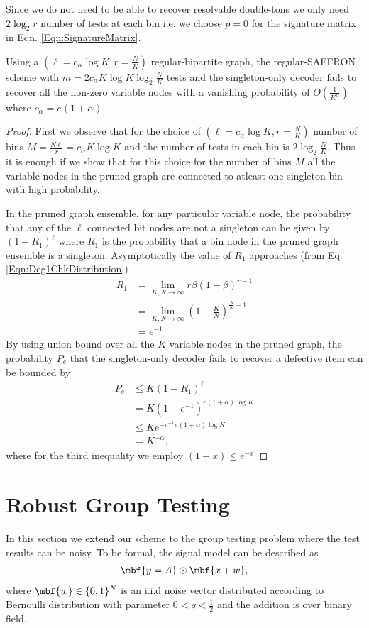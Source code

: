 \documentclass[conference,,twocolumn]{IEEEtran}
\begin{document}
Since we do not need to be able to recover resolvable double-tons we only need $2\log_2 r$ number of tests at each bin i.e. we choose $p=0$ for the signature matrix in Eqn. \eqref{Eqn:SignatureMatrix}.
\begin{theorem}
Using a $(\ell=c_\alpha \log K,r=\frac{N}{K})$ regular-bipartite graph, the regular-SAFFRON scheme with $m=2c_\alpha K\log K \log_2 \frac{N}{K}$ tests and the singleton-only decoder fails to recover all the non-zero variable nodes with a vanishing probability of $O(\frac{1}{K^{\alpha}})$ where $c_\alpha=e(1+\alpha)$.
\end{theorem}
\begin{proof}
First we observe that for the choice of $(\ell=c_\alpha \log K,r=\frac{N}{K})$ number of bins $M=\frac{N\ell}{r}=c_\alpha K \log K$ and the number of tests in each bin is $2\log_2 \frac{N}{K}$. Thus it is enough if we show that for this choice for the number of bins $M$ all the variable nodes in the pruned graph are connected to atleast one singleton bin with high probability.

In the pruned graph ensemble, for any particular variable node, the probability that any of the $\ell$ connected bit nodes are not a singleton can be given by $(1-R_1)^\ell$ where $R_1$ is the probability that a bin node in the pruned graph ensemble is a singleton. Asymptotically the value of $R_1$ approaches (from Eq. \ref{Eqn:Deg1ChkDistribution})
\begin{align*}
R_1&=\lim _{K,N\rightarrow\infty}r\beta(1-\beta)^{r-1}\\
     &=\lim _{K,N\rightarrow\infty}\left(1-\frac{K}{N}\right)^{\frac{N}{K}-1}\\
     &= e^{-1}
\end{align*} 
By using union bound over all the $K$ variable nodes in the pruned graph, the probability $P_e$ that the singleton-only decoder fails to recover a defective item can be bounded by
\begin{align*}
P_e&\leq K(1-R_1)^\ell \\
&=K\left(1-e^{-1}\right)^{e(1+\alpha)\log K}\\
&\leq Ke^{-e^{-1}e(1+\alpha)\log K}\\
&=K^{-\alpha},
\end{align*}
where for the third inequality we employ $(1-x)\leq e^{-x}$
\end{proof}


\section{Robust Group Testing}
\label{Sec:NoisyGroupTesting}
In this section we extend our scheme to the group testing problem where the test results can be noisy. To be formal, the signal model can be described as 
\begin{align*}
\mbf{y=A}\odot \mbf{x+w},
\end{align*}
where $\mbf{w}\in\{0,1\}^N$ is an i.i.d noise vector distributed according to Bernoulli distribution with parameter $0<q<\frac{1}{2}$ and the addition is over binary field.
\end{document}
